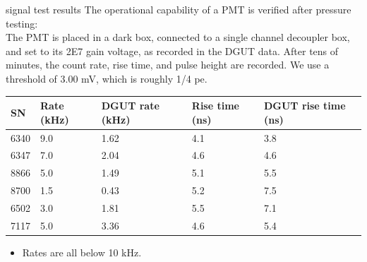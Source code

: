 \documentclass{beamer}
\begin{document}
\begin{frame}{signal test results}
	\small The operational capability of a PMT is verified after pressure testing:\\
	{\scriptsize The PMT is placed in a dark box, connected to a single channel decoupler box,
	and set to its 2E7 gain voltage, as recorded in the DGUT data. After tens of minutes,
	the count rate, rise time, and pulse height are recorded. We use a threshold of 3.00 
	mV, which is roughly 1/4 pe.
	}

	\setlength{\tabcolsep}{2pt}
	\small
	\begin{center}
	\begin{tabular}{|l|p{1.2cm}|p{1.9cm}|p{1.5cm}|p{1.7cm}|}
		\hline
		\textbf{SN}&\textbf{Rate (kHz)}&\textbf{DGUT rate (kHz)}&\textbf{Rise time (ns)}&
		\textbf{DGUT rise time (ns)}\\
		\hline
		\hline
		6340&9.0&1.62&4.1&3.8\\
		6347&7.0&2.04&4.6&4.6\\
		8866&5.0&1.49&5.1&5.5\\
		8700&1.5&0.43&5.2&7.5\\
		6502&3.0&1.81&5.5&7.1\\
		7117&5.0&3.36&4.6&5.4\\
		\hline
	\end{tabular}
		\begin{itemize}
			\item Rates are all below 10 kHz.
		\end{itemize}
	\end{center}
\end{frame}
\end{document}
